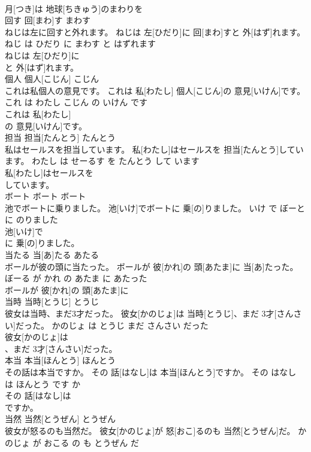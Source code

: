 \documentclass[8pt]{extreport}
\begin{document}
\begin{CJK}{UTF8}{min}
\\	月[つき]は 地球[ちきゅう]のまわりを
\\	回す	回[まわ]す	まわす	
\\	ねじは左に回すと外れます。	ねじは 左[ひだり]に 回[まわ]すと 外[はず]れます。	ねじ は ひだり に まわす と はずれます	
\\	ねじは 左[ひだり]に
\\	と 外[はず]れます。			
\\	個人	個人[こじん]	こじん	
\\	これは私個人の意見です。	これは 私[わたし] 個人[こじん]の 意見[いけん]です。	これ は わたし こじん の いけん です	
\\	これは 私[わたし]
\\	の 意見[いけん]です。			
\\	担当	担当[たんとう]	たんとう	
\\	私はセールスを担当しています。	私[わたし]はセールスを 担当[たんとう]しています。	わたし は せーるす を たんとう して います	
\\	私[わたし]はセールスを
\\	しています。			
\\	ボート	ボート	ボート	
\\	池でボートに乗りました。	池[いけ]でボートに 乗[の]りました。	いけ で ぼーと に のりました	
\\	池[いけ]で
\\	に 乗[の]りました。			
\\	当たる	当[あ]たる	あたる	
\\	ボールが彼の頭に当たった。	ボールが 彼[かれ]の 頭[あたま]に 当[あ]たった。	ぼーる が かれ の あたま に あたった	
\\	ボールが 彼[かれ]の 頭[あたま]に
\\	当時	当時[とうじ]	とうじ	
\\	彼女は当時、まだ3才だった。	彼女[かのじょ]は 当時[とうじ]、まだ 3才[さんさい]だった。	かのじょ は とうじ まだ さんさい だった	
\\	彼女[かのじょ]は
\\	、まだ 3才[さんさい]だった。			
\\	本当	本当[ほんとう]	ほんとう	
\\	その話は本当ですか。	その 話[はなし]は 本当[ほんとう]ですか。	その はなし は ほんとう です か	
\\	その 話[はなし]は
\\	ですか。			
\\	当然	当然[とうぜん]	とうぜん	
\\	彼女が怒るのも当然だ。	彼女[かのじょ]が 怒[おこ]るのも 当然[とうぜん]だ。	かのじょ が おこる の も とうぜん だ	

\end{CJK}
\end{document}
